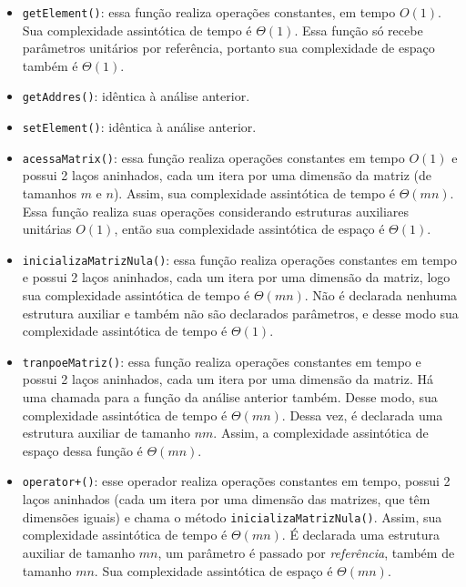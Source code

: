 \documentclass{article}
\def\code#1{\texttt{#1}}
\begin{document}
\begin{itemize}
    \item \code{getElement()}: essa função realiza operações constantes, em tempo \( O(1) \). Sua complexidade assintótica de tempo é \( \Theta(1) \). Essa função só recebe parâmetros unitários por referência, portanto sua complexidade de espaço também é \( \Theta(1) \).

    \item \code{getAddres()}: idêntica à análise anterior.

    \item \code{setElement()}: idêntica à análise anterior.

    \item \code{acessaMatrix()}: essa função realiza operações constantes em tempo \( O(1) \) e possui 2 laços aninhados, cada um itera por uma dimensão da matriz (de tamanhos \( m \) e \( n \)). Assim, sua complexidade assintótica de tempo é \( \Theta(mn) \). Essa função realiza suas operações considerando estruturas auxiliares unitárias \( O(1) \), então sua complexidade assintótica de espaço é \( \Theta(1) \). 

    \item \code{inicializaMatrizNula()}: essa função realiza operações constantes em tempo e possui 2 laços aninhados, cada um itera por uma dimensão da matriz, logo sua complexidade assintótica de tempo é \( \Theta(mn) \). Não é declarada nenhuma estrutura auxiliar e também não são declarados parâmetros, e desse modo sua complexidade assintótica de tempo é \( \Theta(1) \).

    \item \code{tranpoeMatriz()}: essa função realiza operações constantes em tempo e possui 2 laços aninhados, cada um itera por uma dimensão da matriz. Há uma chamada para a função da análise anterior também. Desse modo, sua complexidade assintótica de tempo é \( \Theta(mn) \). Dessa vez, é declarada uma estrutura auxiliar de tamanho \( nm \). Assim, a complexidade assintótica de espaço dessa função é \( \Theta(mn) \). 

    \item \code{operator+()}: esse operador realiza operações constantes em tempo, possui 2 laços aninhados (cada um itera por uma dimensão das matrizes, que têm dimensões iguais) e chama o método \code{inicializaMatrizNula()}. Assim, sua complexidade assintótica de tempo é \( \Theta(mn) \). É declarada uma estrutura auxiliar de tamanho \( mn \), um parâmetro é passado por \textit{referência}, também de tamanho \( mn \). Sua complexidade assintótica de espaço é \( \Theta(mn) \).


\end{itemize}
\end{document}
